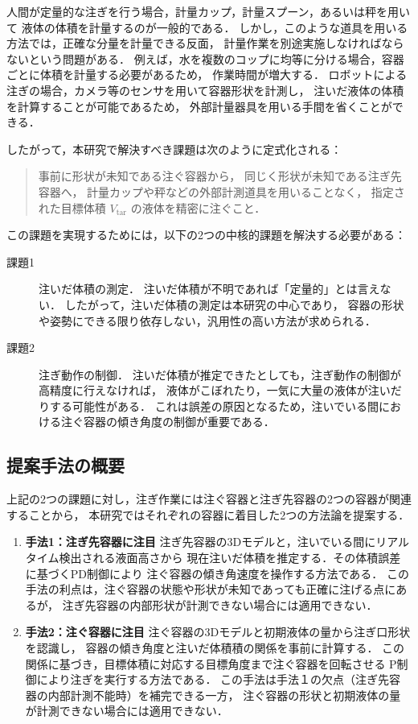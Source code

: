 人間が定量的な注ぎを行う場合，計量カップ，計量スプーン，あるいは秤を用いて
液体の体積を計量するのが一般的である．
しかし，このような道具を用いる方法では，正確な分量を計量できる反面，
計量作業を別途実施しなければならないという問題がある．
例えば，水を複数のコップに均等に分ける場合，容器ごとに体積を計量する必要があるため，
作業時間が増大する．
ロボットによる注ぎの場合，カメラ等のセンサを用いて容器形状を計測し，
注いだ液体の体積を計算することが可能であるため，
外部計量器具を用いる手間を省くことができる．

したがって，本研究で解決すべき課題は次のように定式化される：

\begin{quote}
  事前に形状が未知である注ぐ容器から，
  同じく形状が未知である注ぎ先容器へ，
  計量カップや秤などの外部計測道具を用いることなく，
  指定された目標体積 $V_{\mathrm{tar}}$ の液体を精密に注ぐこと．
\end{quote}

この課題を実現するためには，以下の2つの中核的課題を解決する必要がある：

\begin{description}
  \item[課題1] 注いだ体積の測定．
    注いだ体積が不明であれば「定量的」とは言えない．
    したがって，注いだ体積の測定は本研究の中心であり，
    容器の形状や姿勢にできる限り依存しない，汎用性の高い方法が求められる．
  \item[課題2] 注ぎ動作の制御．
    注いだ体積が推定できたとしても，注ぎ動作の制御が高精度に行えなければ，
    液体がこぼれたり，一気に大量の液体が注いだりする可能性がある．
    これは誤差の原因となるため，注いでいる間における注ぐ容器の傾き角度の制御が重要である．
\end{description}


\subsection{提案手法の概要}

上記の2つの課題に対し，注ぎ作業には注ぐ容器と注ぎ先容器の2つの容器が関連することから，
本研究ではそれぞれの容器に着目した2つの方法論を提案する．

\begin{enumerate}
  \item \textbf{手法1：注ぎ先容器に注目} 
    注ぎ先容器の3Dモデルと，注いでいる間にリアルタイム検出される液面高さから
    現在注いだ体積を推定する．その体積誤差に基づくPD制御により
    注ぐ容器の傾き角速度を操作する方法である．
    この手法の利点は，注ぐ容器の状態や形状が未知であっても正確に注げる点にあるが，
    注ぎ先容器の内部形状が計測できない場合には適用できない．
  
  \item \textbf{手法2：注ぐ容器に注目} 
    注ぐ容器の3Dモデルと初期液体の量から注ぎ口形状を認識し，
    容器の傾き角度と注いだ体積積の関係を事前に計算する．
    この関係に基づき，目標体積に対応する目標角度まで注ぐ容器を回転させる
    P制御により注ぎを実行する方法である．
    この手法は手法１の欠点（注ぎ先容器の内部計測不能時）を補完できる一方，
    注ぐ容器の形状と初期液体の量が計測できない場合には適用できない．
\end{enumerate}

